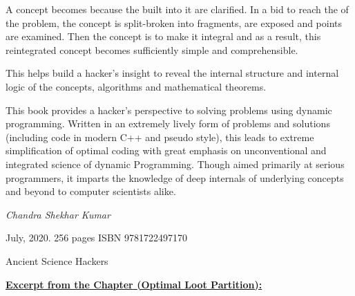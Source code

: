 \hspace{5mm}A concept becomes  because the  built into it are clarified. In a bid to reach the  of the problem, the concept is split-broken into fragments,   are exposed and  points are examined. Then the concept is  to make it integral and as a result, this reintegrated concept becomes sufficiently simple and comprehensible. 

\hspace{5mm}This helps build a hacker's insight to reveal the internal structure and internal logic of the concepts, algorithms and mathematical theorems.

\vspace{3mm}

This book provides a hacker's perspective to solving problems using dynamic programming. Written in an extremely lively form of problems and solutions (including code in modern C++ and pseudo style), this leads to extreme simplification of optimal coding with great emphasis on unconventional and integrated science of dynamic Programming. Though aimed primarily at serious programmers, it imparts the knowledge of deep internals of underlying concepts and beyond to computer scientists alike.


\vspace{0.2in}

  \hfill \emph{Chandra Shekhar Kumar}

\noindent July, 2020. \hfill 256 pages \hfill ISBN  9781722497170

\vspace{5mm}

\begin{quote}
\hspace{5mm}
\end{quote}
\hfill {\calligra Ancient Science Hackers}


\vspace{10mm}


\underline{\textbf{\textcolor{BurntOrange}{Excerpt from the Chapter} \textcolor{Sepia}{(Optimal Loot Partition):}}}


\begin{p}
\end{p}

